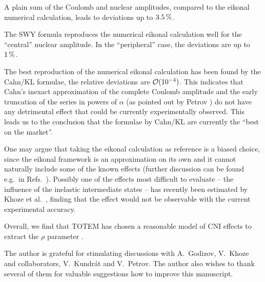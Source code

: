 \documentclass[pdftex,twocolumn,epjc3]{svjour3}
\def\un#1{\,{\rm #1}}
\begin{document}
A plain sum of the Coulomb and nuclear amplitudes, compared to the eikonal numerical calculation, leads to deviations up to $3.5\un{\%}$.

The SWY formula reproduces the numerical eikonal calculation well for the ``central'' nuclear amplitude. In the ``peripheral'' case, the deviations are up to $1\un{\%}$.

The best reproduction of the numerical eikonal calculation has been found by the Cahn/KL formulae, the relative deviations are ${\cal O}(10^{-4})$. This indicates that Cahn's inexact approximation of the complete Coulomb amplitude and the early truncation of the series in powers of $\alpha$ (as pointed out by Petrov \cite{petrov2019,petrov2020}) do not have any detrimental effect that could be currently experimentally observed. This leads us to the conclusion that the formulae by Cahn/KL are currently the ``best on the market''.

One may argue that taking the eikonal calculation as reference is a biased choice, since the eikonal framework is an approximation on its own and it cannot naturally include some of the known effects (further discussion can be found e.g.~in Refs.~\cite{thesis,petrov2018,kmr2019}). Possibly one of the effects most difficult to evaluate -- the influence of the inelastic intermediate states -- has recently been estimated by Khoze et al.~\cite{kmr2019}, finding that the effect would not be observable with the current experimental accuracy.

Overall, we find that TOTEM has chosen a reasonable model of CNI effects to extract the $\rho$ parameter \cite{totem-13tev-rho}.




\begin{acknowledgements}
The author is grateful for stimulating discussions with A.~Godizov, V.~Khoze and collaborators, V.~Kundr\'at and V.~Petrov. The author also wishes to thank several of them for valuable suggestions how to improve this manuscript.
\end{acknowledgements}


\def\journal#1#2#3#4{
	#1 #2 (#3) #4
}
\end{document}
